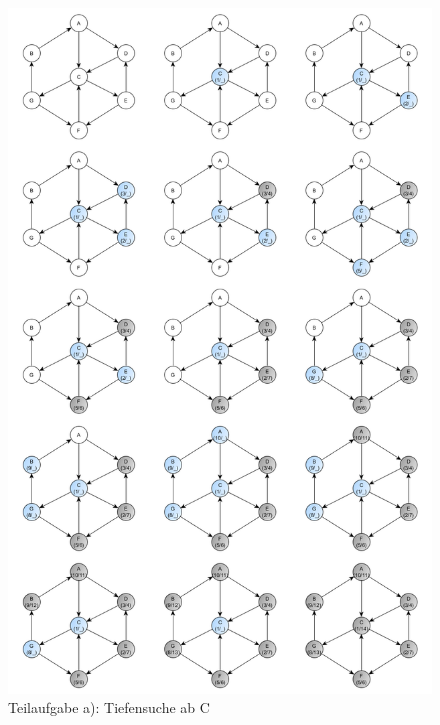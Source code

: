 \documentclass[12pt]{scrartcl}
\begin{document}
\begin{figure}[h!]
\begin{center}
\includegraphics[scale=0.5]{CTiefensucheComplete.png}
\caption{Teilaufgabe a): Tiefensuche ab C}
\end{center}
\end{figure}
\end{document}
